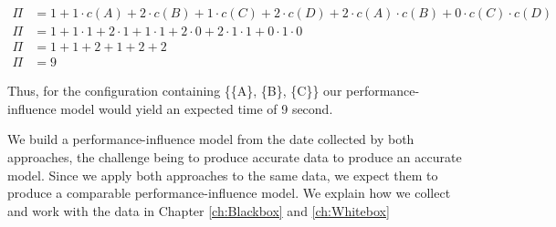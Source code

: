 \begin{align*}
    \Pi &= 1 + 1 \cdot c(A) + 2\cdot c(B) + 1\cdot c(C) + 2\cdot c(D) + 2 \cdot c(A)\cdot c(B) + 0\cdot c(C) \cdot c(D) \\
    \Pi &= 1 + 1 \cdot 1 + 2 \cdot 1 + 1 \cdot 1 + 2 \cdot 0 + 2 \cdot 1 \cdot 1 + 0 \cdot 1 \cdot 0 \\
    \Pi &= 1 + 1 + 2 + 1 + 2 + 2 \\
    \Pi &= 9
\end{align*}

Thus, for the configuration containing \{\{A\}, \{B\}, \{C\}\} our performance-influence model would yield an expected time of 9 second.

We build a performance-influence model from the date collected by both approaches, the challenge being to produce accurate data
to produce an accurate model. Since we apply both approaches to the same data, we expect them to produce a comparable performance-influence model.
We explain how we collect and work with the data in Chapter \ref{ch:Blackbox} and \ref{ch:Whitebox}